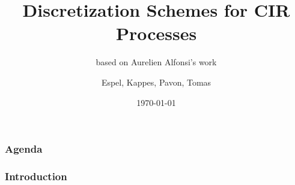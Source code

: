 \documentclass{beamer}
\title{Discretization Schemes for CIR Processes}
\subtitle{based on Aurelien Alfonsi's work}
\author{Espel, Kappes, Pavon, Tomas}
\institute{Imperial College London}
\date{\today}
\begin{document}
\begin{frame}
    \titlepage
\end{frame}

\begin{frame}
\frametitle{Agenda}
\end{frame}

\begin{frame}
\frametitle{Introduction}
\end{frame}
\end{document}
